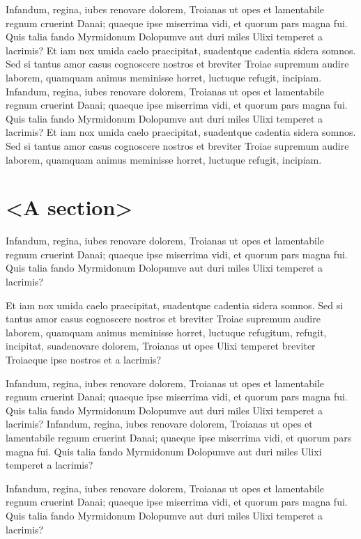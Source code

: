 \documentclass[
    ,final            %
  ]
  {aipproc}
\begin{document}
Infandum, regina, iubes renovare dolorem, Troianas ut opes et
lamentabile regnum cruerint Danai; quaeque ipse miserrima vidi, et
quorum pars magna fui. Quis talia fando Myrmidonum Dolopumve aut duri
miles Ulixi temperet a lacrimis? Et iam nox umida caelo praecipitat,
suadentque cadentia sidera somnos. Sed si tantus amor casus
\cite{Liang:1983} cognoscere nostros et breviter Troiae supremum
audire laborem, quamquam animus meminisse horret, luctuque refugit,
incipiam.  Infandum, regina, iubes renovare dolorem, Troianas ut opes
et lamentabile regnum cruerint Danai; quaeque ipse miserrima vidi, et
quorum pars magna fui. Quis talia fando Myrmidonum Dolopumve aut duri
miles Ulixi temperet a \cite{SJ:1999} lacrimis? Et iam nox umida caelo
praecipitat, suadentque cadentia sidera somnos. Sed si tantus amor
casus cognoscere nostros et breviter Troiae supremum audire laborem,
quamquam animus meminisse horret, luctuque refugit, incipiam.

\section{<A section>}

Infandum, regina, iubes renovare dolorem, Troianas ut opes et
lamentabile regnum cruerint Danai; quaeque ipse miserrima vidi, et
quorum pars magna fui. Quis talia fando Myrmidonum Dolopumve aut duri
miles Ulixi temperet a lacrimis?

Et iam nox umida caelo praecipitat, suadentque cadentia sidera
somnos. Sed si tantus amor casus cognoscere nostros et breviter Troiae
supremum audire \cite{Knuth:WEB} laborem, quamquam animus meminisse
horret, luctuque refugitum, refugit, incipitat, suadenovare dolorem,
Troianas ut opes Ulixi temperet breviter Troiaeque ipse nostros et a
lacrimis?

Infandum, regina, iubes renovare dolorem, Troianas ut opes et
lamentabile regnum cruerint \cite{BrownAustin:2000} Danai; quaeque ipse
miserrima vidi, et quorum pars magna fui. Quis talia fando Myrmidonum
Dolopumve aut duri miles Ulixi temperet a lacrimis?  Infandum, regina,
iubes renovare dolorem, Troianas ut opes et lamentabile regnum
cruerint Danai; quaeque ipse miserrima vidi, et quorum pars magna
fui. Quis talia fando Myrmidonum Dolopumve aut duri miles Ulixi
temperet a lacrimis?


\begin{theacknowledgments}
  Infandum, regina, iubes renovare dolorem, Troianas ut opes et
  lamentabile regnum cruerint Danai; quaeque ipse miserrima vidi, et
  quorum pars magna fui. Quis talia fando Myrmidonum Dolopumve aut duri
  miles Ulixi temperet a lacrimis?
\end{theacknowledgments}
\end{document}
